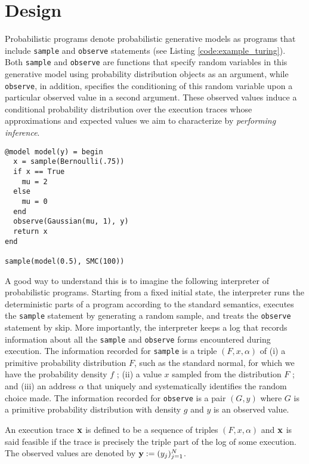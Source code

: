 \section{Design}

Probabilistic programs denote probabilistic generative models as programs that include \texttt{sample} and \texttt{observe} statements (see Listing \ref{code:example_turing}). Both \texttt{sample} and \texttt{observe} are functions that specify random variables in this generative model using probability distribution objects as an argument, while \texttt{observe}, in addition, specifies the conditioning of this random variable upon a particular observed value in a second argument. These observed values induce a conditional probability distribution over the execution traces whose approximations and expected values we aim to characterize by \textit{performing inference}. \\

\begin{lstlisting}[caption={Example of a Turing.jl model},captionpos=b,label=code:example_turing]
@model model(y) = begin
  x = sample(Bernoulli(.75))
  if x == True
    mu = 2
  else
    mu = 0
  end
  observe(Gaussian(mu, 1), y)
  return x
end

sample(model(0.5), SMC(100))
\end{lstlisting}

A good way to understand this is to imagine the following interpreter of probabilistic programs. Starting from a fixed initial state, the interpreter runs the deterministic parts of a program according to the standard semantics, executes the \texttt{sample} statement by generating a random sample, and treats the \texttt{observe} statement by skip. More importantly, the interpreter keeps a log that records information about all the \texttt{sample} and \texttt{observe} forms encountered during execution. The information recorded for \texttt{sample} is a triple $(F, x, \alpha)$ of (i) a primitive probability distribution $F$, such as the standard normal, for which we have the probability density $f$ ; (ii) a value $x$ sampled from the distribution $F$ ; and (iii) an address $\alpha$ that uniquely and systematically identifies the random choice made. The information recorded for \texttt{observe} is a pair $(G,y)$ where $G$ is a primitive probability distribution with density $g$ and $y$ is an observed value.

An execution trace $\boldsymbol{\mathbf{x}}$ is defined to be a sequence of triples $(F, x, \alpha)$ and $\boldsymbol{\mathbf{x}}$ is said feasible if the trace is precisely the triple part of the log of some execution.
The observed values are denoted by $\boldsymbol{\mathbf{y}} := (y_j)_{j=1}^N$.

